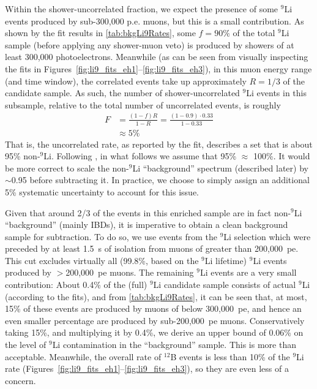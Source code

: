 \documentclass[../thesis.tex]{subfiles}
\begin{document}
Within the shower-uncorrelated fraction, we expect the presence of some $^9$Li events produced by sub-300,000 p.e. muons, but this is a small contribution. As shown by the fit results in \autoref{tab:bkgLi9Rates}, some $f = 90\%$ of the total $^9$Li sample (before applying any shower-muon veto) is produced by showers of at least 300,000 photoelectrons. Meanwhile (as can be seen from visually inspecting the fits in Figures~\ref{fig:li9_fits_eh1}--\ref{fig:li9_fits_eh3}), in this muon energy range (and time window), the correlated events take up approximately $R = 1/3$ of the candidate sample. As such, the number of shower-uncorrelated $^9$Li events in this subsample, relative to the total number of uncorrelated events, is roughly
\begin{equation}
  \label{eq:bkgLi9SpecExtractErr}
  \begin{aligned}
    F &= \frac{(1 - f)R}{1 - R} = \frac{(1 - 0.9) \cdot 0.33}{1 - 0.33} \\
    &\approx 5\%
  \end{aligned}
\end{equation}
That is, the uncorrelated rate, as reported by the fit, describes a set that is about 95\% non-$^9$Li. Following \cite{ChrisLi9}, in what follows we assume that 95\% $\approx$ 100\%. It would be more correct to scale the non-$^9$Li ``background'' spectrum (described later) by $\sim$0.95 before subtracting it. In practice, we choose to simply assign an additional 5\% systematic uncertainty to account for this issue.

Given that around 2/3 of the events in this enriched sample are in fact non-$^9$Li ``background'' (mainly IBDs), it is imperative to obtain a clean background sample for subtraction. To do so, we use events from the $^9$Li selection which were preceded by at least 1.5~s of isolation from muons of greater than 200,000~pe. This cut excludes virtually all (99.8\%, based on the $^9$Li lifetime) $^9$Li events produced by $>$200,000~pe muons. The remaining $^9$Li events are a very small contribution: About 0.4\% of the (full) $^9$Li candidate sample consists of actual $^9$Li (according to the fits), and from \autoref{tab:bkgLi9Rates}, it can be seen that, at most, 15\% of these events are produced by muons of below 300,000~pe, and hence an even smaller percentage are produced by sub-200,000~pe muons. Conservatively taking 15\%, and multiplying it by 0.4\%, we derive an upper bound of 0.06\% on the level of $^9$Li contamination in the ``background'' sample. This is more than acceptable. Meanwhile, the overall rate of $^{12}$B events is less than 10\% of the $^9$Li rate (Figures~\ref{fig:li9_fits_eh1}--\ref{fig:li9_fits_eh3}), so they are even less of a concern.
\end{document}
